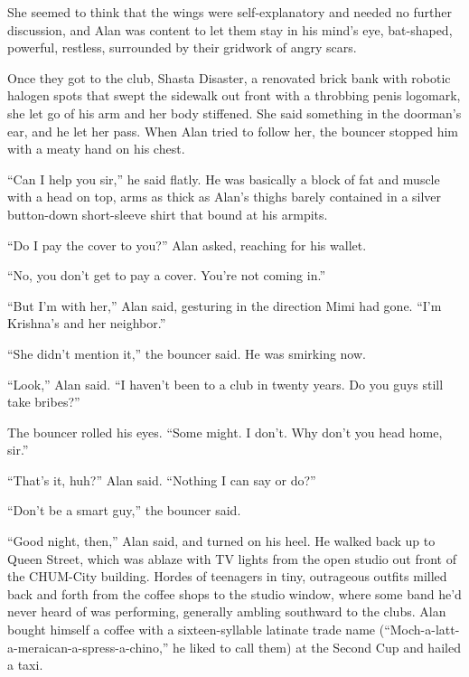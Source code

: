 She seemed to think that the wings were self-explanatory and needed no
further discussion, and Alan was content to let them stay in his
mind's eye, bat-shaped, powerful, restless, surrounded by their
gridwork of angry scars.

Once they got to the club, Shasta Disaster, a renovated brick bank
with robotic halogen spots that swept the sidewalk out front with a
throbbing penis logomark, she let go of his arm and her body
stiffened.  She said something in the doorman's ear, and he let her
pass.  When Alan tried to follow her, the bouncer stopped him with a
meaty hand on his chest.

``Can I help you sir,'' he said flatly.  He was basically a block of
fat and muscle with a head on top, arms as thick as Alan's thighs
barely contained in a silver button-down short-sleeve shirt that bound
at his armpits.

``Do I pay the cover to you?'' Alan asked, reaching for his wallet.

``No, you don't get to pay a cover.  You're not coming in.''

``But I'm with her,'' Alan said, gesturing in the direction Mimi had
gone.  ``I'm Krishna's and her neighbor.''

``She didn't mention it,'' the bouncer said.  He was smirking now.

``Look,'' Alan said.  ``I haven't been to a club in twenty years.  Do
you guys still take bribes?''

The bouncer rolled his eyes.  ``Some might.  I don't.  Why don't you
head home, sir.''

``That's it, huh?'' Alan said.  ``Nothing I can say or do?''

``Don't be a smart guy,'' the bouncer said.

``Good night, then,'' Alan said, and turned on his heel.  He walked
back up to Queen Street, which was ablaze with TV lights from the open
studio out front of the CHUM-City building.  Hordes of teenagers in
tiny, outrageous outfits milled back and forth from the coffee shops
to the studio window, where some band he'd never heard of was
performing, generally ambling southward to the clubs.  Alan bought
himself a coffee with a sixteen-syllable latinate trade name
(``Moch-a-latt-a-meraican-a-spress-a-chino,'' he liked to call them)
at the Second Cup and hailed a taxi.


